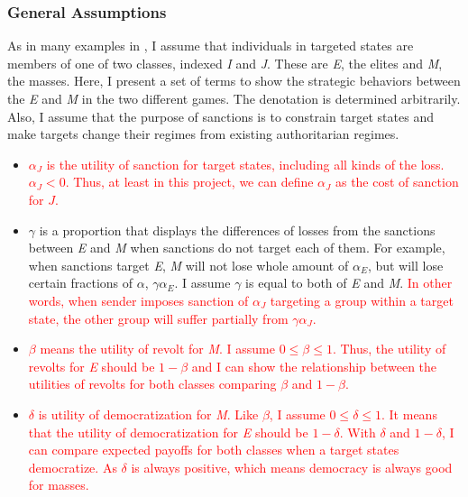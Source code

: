 \documentclass[11pt, letterpage]{article}
\begin{document}
\subsubsection*{General Assumptions}
As in many examples in \cite{Acemoglu2006a}, I assume that individuals in targeted states are members of one of two classes, indexed \textit{I} and \textit{J}. These are \textit{E}, the elites and \textit{M}, the masses. Here, I present a set of terms to show the strategic behaviors between the \textit{E} and \textit{M} in the two different games. The denotation is determined arbitrarily. Also, I assume that the purpose of sanctions is to constrain target states and make targets change their regimes from existing authoritarian regimes.
	
\begin{itemize}
	\item \textcolor{red}{$\alpha_J$ is the utility of sanction for target states, including all kinds of the loss. $\alpha_J < 0$. Thus, at least in this project, we can define $\alpha_J$ as the cost of sanction for $J$.}
	\item $\gamma$ is a proportion that displays the differences of losses from the sanctions between \textit{E} and \textit{M} when sanctions do not target each of them. For example, when sanctions target \textit{E}, \textit{M} will not lose whole amount of $\alpha_{E}$, but will lose certain fractions of $\alpha$, $\gamma\alpha_{E}$. I assume $\gamma$ is equal to both of \textit{E} and \textit{M}. \textcolor{red}{In other words, when sender imposes sanction of $\alpha_J$ targeting a group within a target state, the other group will suffer partially from $\gamma\alpha_J$.}
	\item \textcolor{red}{$\beta$ means the utility of revolt for \textit{M}. I assume $0\leq\beta\leq1$. Thus, the utility of revolts for \textit{E} should be $1-\beta$ and I can show the relationship between the utilities of revolts for both classes comparing $\beta$ and $1-\beta$.}
	\item \textcolor{red}{$\delta$ is utility of democratization for \textit{M}. Like $\beta$, I assume $0\leq\delta\leq1$. It means that the utility of democratization for \textit{E} should be $1-\delta$. With $\delta$ and $1-\delta$, I can compare expected payoffs for both classes when a target states democratize. As $\delta$ is always positive, which means democracy is always good for masses.}
\end{itemize}
	
\end{document}
